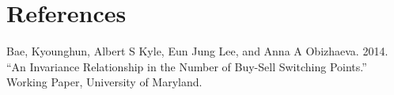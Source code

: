 \documentclass[
  12pt,
]{article}
\begin{document}
\newpage

\hypertarget{references}{%
\section*{References}\label{references}}

\hypertarget{refs}{}
\leavevmode\hypertarget{ref-bae2014invariance}{}%
Bae, Kyounghun, Albert S Kyle, Eun Jung Lee, and Anna A Obizhaeva. 2014.
``An Invariance Relationship in the Number of Buy-Sell Switching
Points.'' Working Paper, University of Maryland.
\end{document}
